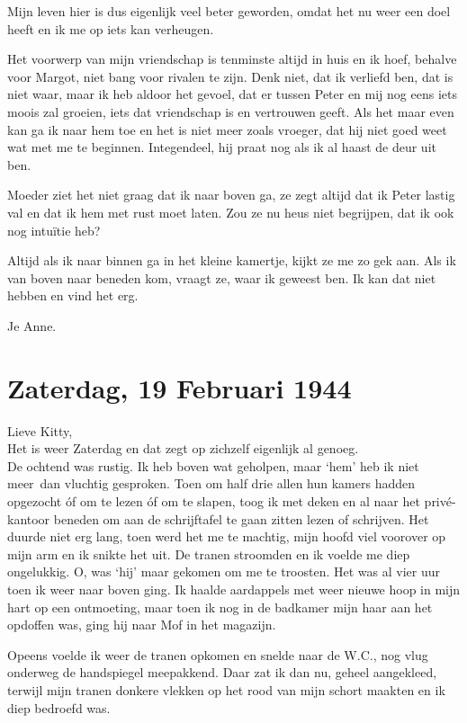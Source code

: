 \documentclass{book}
\begin{document}
Mijn leven hier is dus eigenlijk veel beter geworden, omdat het nu weer een doel
heeft en ik me op iets kan verheugen.

Het voorwerp van mijn vriendschap is tenminste altijd in huis en ik hoef,
behalve voor Margot, niet bang voor rivalen te zijn. Denk niet, dat ik verliefd
ben, dat is niet waar, maar ik heb aldoor het gevoel, dat er tussen Peter en mij
nog eens iets moois zal groeien, iets dat vriendschap is en vertrouwen geeft.
Als het maar even kan ga ik naar hem toe en het is niet meer zoals vroeger, dat
hij niet goed weet wat met me te beginnen. Integendeel, hij praat nog als ik al
haast de deur uit ben.

Moeder ziet het niet graag dat ik naar boven ga, ze zegt altijd dat ik Peter
lastig val en dat ik hem met rust moet laten. Zou ze nu heus niet begrijpen, dat
ik ook nog intuïtie heb?

Altijd als ik naar binnen ga in het kleine kamertje, kijkt ze me zo gek aan. Als
ik van boven naar beneden kom, vraagt ze, waar ik geweest ben.  Ik kan dat niet
hebben en vind het erg.

Je Anne.

\section*{Zaterdag, 19 Februari 1944}

Lieve Kitty,\\
Het is weer Zaterdag en dat zegt op zichzelf eigenlijk al
genoeg.\\
De ochtend was rustig. Ik heb boven wat geholpen, maar `hem' heb ik
niet meer~dan vluchtig gesproken. Toen om half drie allen hun kamers hadden
opgezocht óf om te lezen óf om te slapen, toog ik met deken en al naar het
privé-kantoor beneden om aan de schrijftafel te gaan zitten lezen of schrijven.
Het duurde niet erg lang, toen werd het me te machtig, mijn hoofd viel voorover
op mijn arm en ik snikte het uit. De tranen stroomden en ik voelde me diep
ongelukkig. O, was `hij' maar gekomen om me te troosten. Het was al vier uur
toen ik weer naar boven ging. Ik haalde aardappels met weer nieuwe hoop in mijn
hart op een ontmoeting, maar toen ik nog in de badkamer mijn haar aan het
opdoffen was, ging hij naar Mof in het magazijn.

Opeens voelde ik weer de tranen opkomen en snelde naar de W.C., nog vlug
onderweg de handspiegel meepakkend. Daar zat ik dan nu, geheel aangekleed,
terwijl mijn tranen donkere vlekken op het rood van mijn schort maakten en ik
diep bedroefd was.
\end{document}
